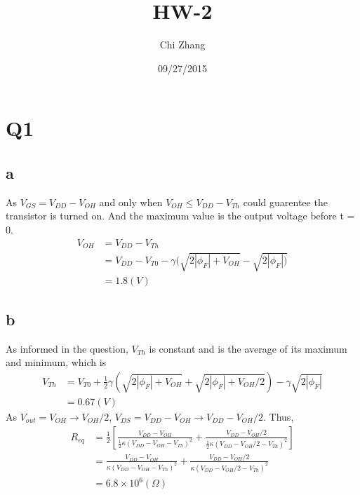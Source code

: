 \documentclass[a4paper,10pt]{article}
\title{HW-2}
\author{Chi Zhang}
\date{09/27/2015}
\begin{document}
\maketitle
\section*{Q1}
\subsection*{a}
As \begin{math}V_{GS} = V_{DD} - V_{OH}\end{math} and only when \begin{math}V_{OH} \leq V_{DD} - V_{Th}\end{math} could 
guarentee the transistor is turned on. And the maximum value is the output voltage before t = 0.
\begin{equation}
\begin{split}
 V_{OH} &= V_{DD} - V_{Th}\\
        &= V_{DD} - V_{T0} - \gamma(\sqrt{2|\phi_F| + V_{OH}} - \sqrt{2|\phi_F|)}\\
        &= 1.8(V)
\end{split}
\end{equation}
\subsection*{b}
As informed in the question, \begin{math}V_{Th}\end{math} is constant and is the average of its maximum and minimum, which is
\begin{equation}
\begin{split}
V_{Th} &= V_{T0} + \frac{1}{2}\gamma(\sqrt{2|\phi_F| + V_{OH}} + \sqrt{2|\phi_F| + V_{OH}/2}) -\gamma\sqrt{2|\phi_F|}\\
&=0.67(V)
\end{split}
\end{equation}
As \begin{math}V_{out} = V_{OH} \rightarrow V_{OH}/2\end{math}, \begin{math}V_{DS} = V_{DD} - V_{OH} \rightarrow V_{DD} -
V_{OH}/2\end{math}. Thus,
\begin{equation}
\begin{split}
R_{eq} &= \frac{1}{2}\left[ \frac{V_{DD} - V_{OH}}{\frac{1}{2}\kappa(V_{DD}-V_{OH}-V_{Th}) ^2} + \frac{V_{DD} - V_{OH}/2}{\frac{1}{2}\kappa(V_{DD}-V_{OH}/2-V_{Th}) ^2}\right]\\
&= \frac{V_{DD} - V_{OH}}{\kappa(V_{DD}-V_{OH}-V_{Th}) ^2} + \frac{V_{DD} - V_{OH}/2}{\kappa(V_{DD}-V_{OH}/2-V_{Th}) ^2}\\
&=6.8\times 10^6 (\Omega)
\end{split}
\end{equation}
\end{document}
